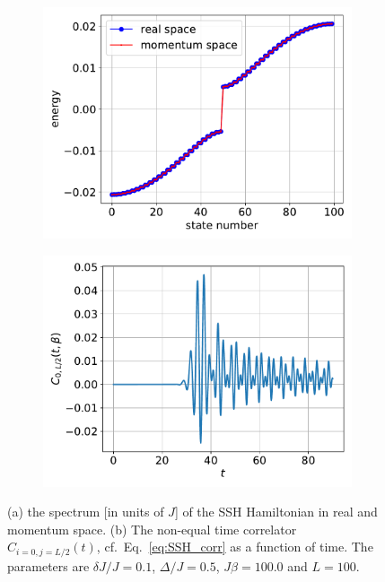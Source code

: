 \documentclass{SciPost}
\newcommand\0{\scalebox{-1}[1]{0}}
\begin{document}
\begin{figure}[t!]
	\centering
	\begin{subfigure}[b]{0.496\textwidth}
		\includegraphics[width=\textwidth]{SSH_spectrum.pdf}
	\end{subfigure}
	\begin{subfigure}[b]{0.496\textwidth}
		\includegraphics[width=\textwidth]{SSH_correlator.pdf}
	\end{subfigure}
	\caption{\label{fig:SSH} (a) the spectrum [in units of $J$] of the SSH Hamiltonian in real and momentum space. (b) The non-equal time correlator $C_{i=0,j=L/2}(t)$, cf.~Eq.~\eqref{eq:SSH_corr} as a function of time. The parameters are $\delta J/J=0.1$, $\Delta/J=0.5$, $J\beta=100.0$ and $L=100$.}  
\end{figure} 
\end{document}
